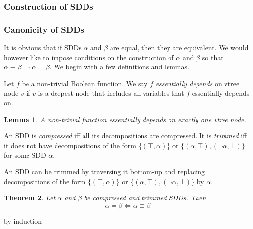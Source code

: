 \documentclass{article}
\newtheorem{theorem}{Theorem}[section]
\newtheorem{lemma}[theorem]{Lemma}
\newenvironment{proof}[1][Proof]{\begin{trivlist}
\item[\hskip \labelsep {\bfseries #1}]}{\end{trivlist}}
\newenvironment{definition}[1][Definition]{\begin{trivlist}
\item[\hskip \labelsep {\bfseries #1}]}{\end{trivlist}}
\begin{document}
\subsubsection{Construction of SDDs}



\subsubsection{Canonicity of SDDs} 

It is obvious that if SDDs $\alpha$ and $\beta$ are equal, then they are equivalent. We would however like 
to impose conditions on the construction of $\alpha$ and $\beta$  so that $\alpha \equiv \beta \Rightarrow \alpha = \beta$.
We begin with a few definitions and lemmas.

\begin{definition}
Let $f$ be a non-trivial Boolean function. We say $f$ \textit{essentially depends} on vtree node $v$ if $v$ is a deepest node that includes all variables that $f$ essentially depends on. 
\end{definition}

\begin{lemma}
A non-trivial function essentially depends on exactly one vtree node.
\end{lemma} 

\begin{proof} 

\end{proof}
 
\begin{definition}
An SDD is \textit{compressed} iff all its decompositions are compressed. It is \textit{trimmed} iff it does not have decompositions of the form $\{(\top, \alpha)\}$ or $\{(\alpha, \top), (\lnot\alpha, \bot)\}$ for some SDD $\alpha$.
\end{definition}

An SDD can be trimmed by traversing it bottom-up and replacing decompositions of the form  $\{(\top, \alpha)\}$ or $\{(\alpha, \top), (\lnot\alpha, \bot)\}$ by $\alpha$.

\begin{theorem} 
Let $\alpha$ and $\beta$ be compressed and trimmed SDDs. Then $$\alpha = \beta \Leftrightarrow \alpha \equiv \beta$$
\end{theorem}

\begin{proof}
by induction
\end{proof}
\end{document}
